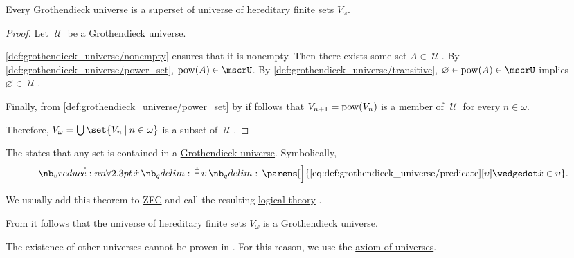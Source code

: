 \begin{lemma}\label{thm:grothendieck_universe_contains_finite_sets}
  Every Grothendieck universe is a superset of universe of hereditary finite sets \hyperref[def:universe_of_hereditary_finite_sets]{\( V_\omega \)}.
\end{lemma}
\begin{proof}
  Let \( \mscrU \) be a Grothendieck universe.

  \ref{def:grothendieck_universe/nonempty} ensures that it is nonempty. Then there exists some set \( A \in \mscrU \). By \ref{def:grothendieck_universe/power_set}, \( \pow(A) \in \mscrU \). By \ref{def:grothendieck_universe/transitive}, \( \varnothing \in \pow(A) \in \mscrU \) implies \( \varnothing \in \mscrU \).

  Finally, from \ref{def:grothendieck_universe/power_set} by  if follows that \( V_{n+1} = \operatorname{pow}(V_n) \) is a member of \( \mscrU \) for every \( n \in \omega \).

  Therefore, \( V_\omega = \bigcup \set{ V_n \given n \in \omega } \) is a subset of \( \mscrU \).
\end{proof}

\begin{definition}\label{def:axiom_of_universes}
  The  states that any set is contained in a \hyperref[def:grothendieck_universe]{Grothendieck universe}. Symbolically,
  \begin{equation}\label{eq:def:axiom_of_universes}
    \begin{aligned}
      \qforall \synx \qexists \upsilon \parens[\Big]{ \ref{eq:def:grothendieck_universe/predicate}[\upsilon] \synwedge \synx \in \upsilon }.
    \end{aligned}
  \end{equation}

  We usually add this theorem to \hyperref[def:zfc]{ZFC} and call the resulting \hyperref[def:first_order_theory]{logical theory} .
\end{definition}

\begin{example}\label{ex:def:axiom_of_universes}
  From  it follows that the universe of hereditary finite sets \hyperref[def:universe_of_hereditary_finite_sets]{\( V_\omega \)} is a Grothendieck universe.

  The existence of other universes cannot be proven in . For this reason, we use the \hyperref[def:axiom_of_universes]{axiom of universes}.
\end{example}

